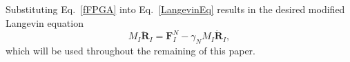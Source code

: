 Substituting Eq.~\ref{fFPGA} into Eq.~\ref{LangevinEq} results in the desired modified Langevin equation 
\begin{equation} \label{modLangevin}
M_{I}\ddot{\textbf{R}}_{I} = \textbf{F}_{I}^{N}-\gamma _{N}M_{I}\dot{\textbf{R}}_{I}, 
\end{equation}
which will be used throughout the remaining of this paper.

